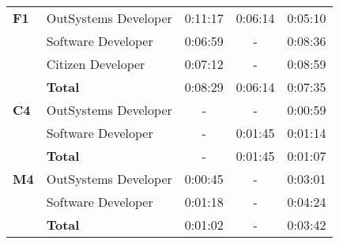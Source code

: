 \begin{table}[tb]
\begin{tabular}{llrcr}
    \textbf{F1}               & OutSystems Developer & 0:11:17                                                           & \multicolumn{1}{r}{0:06:14}                                             & 0:05:10                                                       \\
                              & Software Developer   & 0:06:59                                                           & -                                                                       & 0:08:36                                                       \\
                              & Citizen Developer    & 0:07:12                                                           & -                                                                       & 0:08:59                                                       \\
                              & \textbf{Total}       & 0:08:29                                                           & \multicolumn{1}{r}{0:06:14}                                             & 0:07:35                                                       \\ \hline
    \textbf{C4}               & OutSystems Developer & \multicolumn{1}{c}{-}                                             & -                                                                       & 0:00:59                                                       \\
                              & Software Developer   & \multicolumn{1}{c}{-}                                             & \multicolumn{1}{r}{0:01:45}                                             & 0:01:14                                                       \\
                              & \textbf{Total}       & \multicolumn{1}{c}{-}                                             & \multicolumn{1}{r}{0:01:45}                                             & 0:01:07                                                       \\ \hline
    \textbf{M4}               & OutSystems Developer & 0:00:45                                                           & -                                                                       & 0:03:01                                                       \\
                              & Software Developer   & 0:01:18                                                           & -                                                                       & 0:04:24                                                       \\
                              & \textbf{Total}       & 0:01:02                                                           & -                                                                       & 0:03:42                                                       \\ \hline
    \end{tabular}
    \end{table}
  

